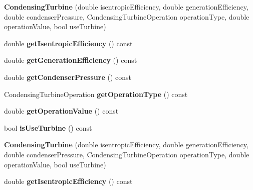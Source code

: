 \begin{DoxyCompactItemize}
\item 
\mbox{\label{class_condensing_turbine_a82cf4697556eebee1777cd26ec9a4776}} 
{\bfseries Condensing\+Turbine} (double isentropic\+Efficiency, double generation\+Efficiency, double condenser\+Pressure, Condensing\+Turbine\+Operation operation\+Type, double operation\+Value, bool use\+Turbine)
\item 
\mbox{\label{class_condensing_turbine_a7da0935b7826855e5a57561f6eac542a}} 
double {\bfseries get\+Isentropic\+Efficiency} () const
\item 
\mbox{\label{class_condensing_turbine_a76c3f6edd970f5cde5fdfca90a9b657c}} 
double {\bfseries get\+Generation\+Efficiency} () const
\item 
\mbox{\label{class_condensing_turbine_a318c217b329e9752e3316545595b25bd}} 
double {\bfseries get\+Condenser\+Pressure} () const
\item 
\mbox{\label{class_condensing_turbine_a2d6f79f0c23dd2a69dd606a031d62093}} 
Condensing\+Turbine\+Operation {\bfseries get\+Operation\+Type} () const
\item 
\mbox{\label{class_condensing_turbine_a2d4208cf1204e75b9aa3d9f10478a263}} 
double {\bfseries get\+Operation\+Value} () const
\item 
\mbox{\label{class_condensing_turbine_ae29c56a2fc4c8833f8a244b19d886fd4}} 
bool {\bfseries is\+Use\+Turbine} () const
\item 
\mbox{\label{class_condensing_turbine_a82cf4697556eebee1777cd26ec9a4776}} 
{\bfseries Condensing\+Turbine} (double isentropic\+Efficiency, double generation\+Efficiency, double condenser\+Pressure, Condensing\+Turbine\+Operation operation\+Type, double operation\+Value, bool use\+Turbine)
\item 
\mbox{\label{class_condensing_turbine_a7da0935b7826855e5a57561f6eac542a}} 
double {\bfseries get\+Isentropic\+Efficiency} () const
\item 

\end{DoxyCompactItemize}
